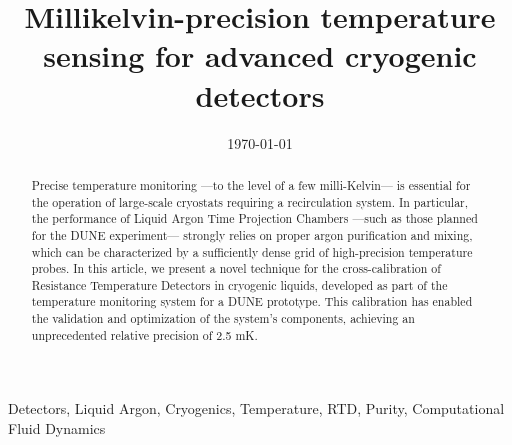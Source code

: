 \documentclass[review,1p,number,sort&compress]{elsarticle}
\begin{document}
\title{Millikelvin-precision temperature sensing for advanced cryogenic detectors}


\date{\today}

\begin{abstract}
Precise temperature monitoring  ---to the level of a few milli-Kelvin--- is essential for the operation of large-scale cryostats requiring a recirculation system. In particular, the performance of Liquid Argon Time Projection Chambers ---such as those planned for the DUNE experiment--- strongly relies on proper argon purification and mixing, which can be characterized by a sufficiently dense grid of high-precision temperature probes. In this article, we present a novel technique for the cross-calibration of Resistance Temperature Detectors in cryogenic liquids, developed as part of the temperature monitoring system for a DUNE prototype. This calibration has enabled the validation and optimization of the system’s components, achieving an unprecedented relative precision of 2.5 mK.

\end{abstract}

\begin{keyword}
Detectors, Liquid Argon, Cryogenics, Temperature, RTD, Purity, Computational Fluid Dynamics
\end{keyword}

\maketitle











\end{document}
